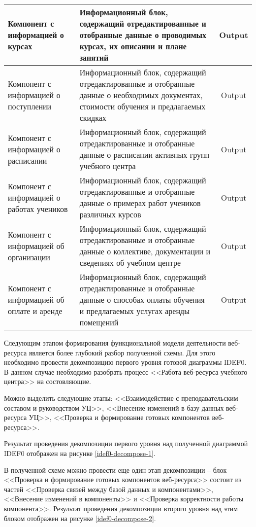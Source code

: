 \begin{small}
\begin{longtable}[h]{| p{5.8cm} | p{7.8cm} | c |}
    \hline
    Компонент с информацией о курсах&
    Информационный блок, содержащий отредактированные и отобранные данные о проводимых курсах, их описании и плане занятий&
    Output\\
    \hline
    Компонент с информацией о поступлении&
    Информационный блок, содержащий отредактированные и отобранные данные о необходимых документах, стоимости обучения и предлагаемых скидках&
    Output\\
    \hline
    Компонент с информацией о расписании&
    Информационный блок, содержащий отредактированные и отобранные данные о расписании активных групп учебного центра&
    Output\\
    \hline
    Компонент с информацией о работах учеников&
    Информационный блок, содержащий отредактированные и отобранные данные о примерах работ учеников различных курсов&
    Output\\
    \hline
    Компонент с информацией об организации&
    Информационный блок, содержащий отредактированные и отобранные данные о коллективе, документации и сведениях об учебном центре&
    Output\\
    \hline
    Компонент с информацией об оплате и аренде&
    Информационный блок, содержащий отредактированные и отобранные данные о способах оплаты обучения и предлагаемых услугах аренды помещений&
    Output\\
    \hline
\end{longtable}
\end{small}

Следующим этапом формирования функциональной модели деятельности веб-ресурса является более глубокий разбор полученной схемы.
Для этого необходимо провести декомпозицию первого уровня готовой диаграммы IDEF0.
В данном случае необходимо разобрать процесс <<Работа веб-ресурса учебного центра>> на состовляющие.

Можно выделить следующие этапы: <<Взаимодействие с преподавательским составом и руководством УЦ>>, <<Внесение изменений в базу данных веб-ресурса УЦ>>, <<Проверка и формирование готовых компонентов веб-ресурса>>.

Результат проведения декомпозиции первого уровня над полученной диаграммой IDEF0 отображен на рисунке \ref{idef0-decompose-1}.

В полученной схеме можно провести еще один этап декомпозиции -- блок <<Проверка и формирование готовых компонентов веб-ресурса>> состоит из частей <<Проверка связей между базой данных и компонентами>>, <<Внесение изменений в компоненты>> и <<Проверка корректности работы компонента>>.
Результат проведения декомпозиции второго уровня над этим блоком отображен на рисунке \ref{idef0-decompose-2}.

